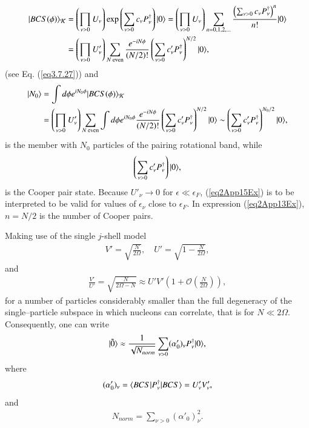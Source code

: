 \begin{subappendices}
\begin{align}
\nonumber|{BCS(\phi)} \rangle_{\mathcal K}&=\left(\prod_{\nu>0}U_\nu\right)\exp\left(\sum_{\nu>0}c_\nu P_\nu^\dagger\right)|{0} \rangle=\left(\prod_{\nu>0}U_\nu\right)\sum_{n=0,1,2,\dots}\frac{\left(\sum_{\nu>0}c_\nu P^\dagger_\nu\right)^n}{n!}|{0} \rangle\\
&=\left(\prod_{\nu>0}U'_\nu\right)\sum_{N \text{ even}}\frac{e^{-iN\phi}}{(N/2)!}\left(\sum_{\nu>0}c'_\nu P_\nu^\dagger\right)^{N/2}|{0} \rangle,
\end{align}
(see Eq. (\ref{eq3.7.27})) and
\begin{align}\label{eq2App14Ex}
\nonumber|{N_0} \rangle&=\int d\phi e^{iN_0\phi}|{BCS(\phi)} \rangle_{\mathcal K}\\
&=\left(\prod_{\nu>0}U'_\nu\right)\sum_{N \text{ even}}\int d\phi e^{iN_0\phi}\frac{e^{-iN\phi}}{(N/2)!}\left(\sum_{\nu>0}c'_\nu P_\nu^\dagger\right)^{N/2}|{0} \rangle\sim\left(\sum_{\nu>0}c'_\nu P_\nu^\dagger\right)^{N_0/2}|{0} \rangle,
\end{align}
is the member with $N_0$ particles of the pairing rotational band, while
\begin{align}\label{eq2App15Ex}
\left(\sum_{\nu>0}c'_\nu P_\nu^\dagger\right)\ket{0}, \idx{Cooper pair!--state}
\end{align}
is the Cooper pair state. Because $U'_\nu\to 0$ for $\epsilon\ll \epsilon_F$, (\ref{eq2App15Ex}) is to be interpreted to be valid for values of $\epsilon_\nu$ close to $\epsilon_F$. In expression (\ref{eq2App13Ex}), $n=N/2$ is the number of Cooper pairs.


Making use of the single $j$-shell model
\begin{align}\label{eq2App16Ex}
V'=\sqrt{\frac{N}{2\Omega}},\quad U'=\sqrt{1-\frac{N}{2\Omega}},
\end{align}
and
\begin{align}\label{eq2App17Ex}
\frac{V'}{U'}=\sqrt{\frac{N}{2\Omega-N}}\approx U'V'\left(1+\mathcal O\left(\frac{N}{2\Omega}\right)\right),
\end{align}
for a number of particles considerably smaller than the full degeneracy of the single--particle subspace in which nucleons can correlate, that is for $N\ll2\Omega$. Consequently, one can write
\begin{align}\label{eq2App18Ex}
|{\tilde 0} \rangle\approx\frac{1}{\sqrt{ N_{norm}}}\sum_{\nu>0}(\alpha'_0)_\nu P^\dagger_\nu|{0} \rangle,
\end{align}
where
\begin{align}\label{eq2App19Ex}
(\alpha'_0)_\nu =\langle {BCS|P^\dagger_\nu|BCS} \rangle=U'_\nu V'_\nu,
\end{align}
and
\begin{align}\label{eq2App20Ex}
N_{norm}=\sum_{\nu>0}(\alpha'_0)_\nu^2.
\end{align}











\end{subappendices}















% 
%
